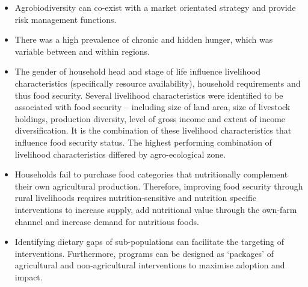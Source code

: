 \begin{itemize}
\item Agrobiodiversity can co-exist with a market orientated strategy and provide risk management functions.

\item	There was a high prevalence of chronic and hidden hunger, which was variable between and within regions.

\item	The gender of household head and stage of life influence livelihood characteristics (specifically resource availability), household requirements and thus food security. Several livelihood characteristics were identified to be associated with food security – including size of land area, size of livestock holdings, production diversity, level of gross income and extent of income diversification. It is the combination of these livelihood characteristics that influence food security status. The highest performing combination of livelihood characteristics differed by agro-ecological zone.

\item	Households fail to purchase food categories that nutritionally complement their own agricultural production. Therefore, improving food security through rural livelihoods requires nutrition-sensitive and nutrition specific interventions to increase supply, add nutritional value through the own-farm channel and increase demand for nutritious foods.

\item	Identifying dietary gaps of sub-populations can facilitate the targeting of interventions. Furthermore, programs can be designed as `packages' of agricultural and non-agricultural interventions to maximise adoption and impact.

\end{itemize}
